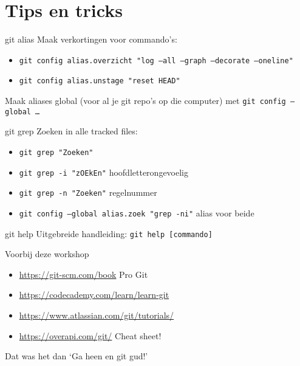 \section[Tips]{Tips en tricks}

\begin{frame}{git alias}
	Maak verkortingen voor commando's:
	\begin{itemize}
		\item \texttt{git config alias.overzicht "log --all --graph --decorate --oneline"}
		\item \texttt{git config alias.unstage "reset HEAD"}
	\end{itemize}
	Maak aliases global (voor al je git repo's op die computer) met \texttt{git config --global \ldots}
\end{frame}

\begin{frame}{git grep}
	Zoeken in alle tracked files:
	\begin{itemize}
		\item \texttt{git grep "Zoeken"}
		\item \texttt{git grep -i "zOEkEn"} hoofdletterongevoelig
		\item \texttt{git grep -n "Zoeken"} regelnummer
		\item \texttt{git config --global alias.zoek "grep -ni"} alias voor beide
	\end{itemize}
\end{frame}

\begin{frame}{git help}
	Uitgebreide handleiding: \texttt{git help [commando]}
\end{frame}

\begin{frame}{Voorbij deze workshop}
	\begin{itemize}
		\item \url{https://git-scm.com/book} Pro Git
		\item \url{https://codecademy.com/learn/learn-git}
		\item \url{https://www.atlassian.com/git/tutorials/}
		\item \url{https://overapi.com/git/} Cheat sheet!
	\end{itemize}
\end{frame}

\begin{frame}{Dat was het dan}
	`Ga heen en git gud!'
\end{frame}
